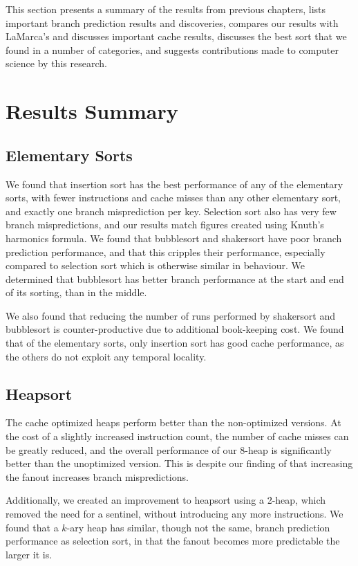 \label{conclusions}
This section presents a summary of the results from previous chapters, lists
important branch prediction results and discoveries, compares our results with
LaMarca's and discusses important cache results, discusses the best sort that we
found in a number of categories, and suggests contributions made to computer
science by this research.

\section{Results Summary}


\subsection{Elementary Sorts}

We found that insertion sort has the best performance of any of the elementary
sorts, with fewer instructions and cache misses than any other elementary sort,
and exactly one branch misprediction per key. Selection sort also has very few
branch mispredictions, and our results match figures created using Knuth's
harmonics formula. We found that bubblesort and shakersort have poor branch
prediction performance, and that this cripples their performance, especially
compared to selection sort which is otherwise similar in behaviour. We
determined that bubblesort has better branch performance at the start and end of
its sorting, than in the middle.

We also found that reducing the number of runs performed by shakersort and
bubblesort is counter-productive due to additional book-keeping cost. We found
that of the elementary sorts, only insertion sort has good cache performance, as
the others do not exploit any temporal locality.


\subsection{Heapsort}

The cache optimized heaps perform better than the non-optimized versions. At the
cost of a slightly increased instruction count, the number of cache misses can
be greatly reduced, and the overall performance of our 8-heap is significantly
better than the unoptimized version. This is despite our finding of that
increasing the fanout increases branch mispredictions.

Additionally, we created an improvement to heapsort using a 2-heap, which
removed the need for a sentinel, without introducing any more instructions. We
found that a $k$-ary heap has similar, though not the same, branch prediction
performance as selection sort, in that the fanout becomes more predictable the
larger it is.


